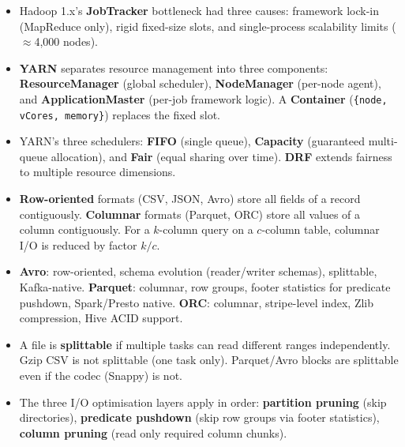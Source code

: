 \begin{itemize}
  \item Hadoop 1.x's \textbf{JobTracker} bottleneck had three causes:
        framework lock-in (MapReduce only), rigid fixed-size slots,
        and single-process scalability limits ($\approx$4{,}000 nodes).

  \item \textbf{YARN} separates resource management into three
        components: \textbf{ResourceManager} (global scheduler),
        \textbf{NodeManager} (per-node agent), and
        \textbf{ApplicationMaster} (per-job framework logic).
        A \textbf{Container} (\texttt{\{node, vCores, memory\}})
        replaces the fixed slot.

  \item YARN's three schedulers: \textbf{FIFO} (single queue),
        \textbf{Capacity} (guaranteed multi-queue allocation),
        and \textbf{Fair} (equal sharing over time). \textbf{DRF}
        extends fairness to multiple resource dimensions.

  \item \textbf{Row-oriented} formats (CSV, JSON, Avro) store all
        fields of a record contiguously. \textbf{Columnar} formats
        (Parquet, ORC) store all values of a column contiguously.
        For a $k$-column query on a $c$-column table, columnar I/O
        is reduced by factor $k/c$.

  \item \textbf{Avro}: row-oriented, schema evolution (reader/writer
        schemas), splittable, Kafka-native. \textbf{Parquet}:
        columnar, row groups, footer statistics for predicate pushdown,
        Spark/Presto native. \textbf{ORC}: columnar, stripe-level
        index, Zlib compression, Hive ACID support.

  \item A file is \textbf{splittable} if multiple tasks can read
        different ranges independently. Gzip CSV is not splittable
        (one task only). Parquet/Avro blocks are splittable even if
        the codec (Snappy) is not.

  \item The three I/O optimisation layers apply in order:
        \textbf{partition pruning} (skip directories), \textbf{predicate
        pushdown} (skip row groups via footer statistics),
        \textbf{column pruning} (read only required column chunks).
\end{itemize}

